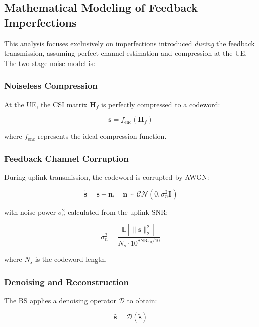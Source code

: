 \documentclass[lettersize,journal]{IEEEtran}
\begin{document}
\subsection{Mathematical Modeling of Feedback Imperfections}
\label{subsec:feedback_noise}

This analysis focuses exclusively on imperfections introduced \textit{during} the feedback transmission, assuming perfect channel estimation and compression at the UE. The two-stage noise model is:

\subsubsection{Noiseless Compression}
At the UE, the CSI matrix $\mathbf{H}_f$ is perfectly compressed to a codeword:

\begin{equation}
    \mathbf{s} = f_{\text{enc}}(\mathbf{H}_f)
\end{equation}

where $f_{\text{enc}}$ represents the ideal compression function.

\subsubsection{Feedback Channel Corruption}
During uplink transmission, the codeword is corrupted by AWGN:

\begin{equation}
    \tilde{\mathbf{s}} = \mathbf{s} + \mathbf{n}, \quad \mathbf{n} \sim \mathcal{CN}(0,\sigma_n^2\mathbf{I})
    \label{eq:noisy_feedback}
\end{equation}

with noise power $\sigma_n^2$ calculated from the uplink SNR:

\begin{equation}
    \sigma_n^2 = \frac{\mathbb{E}[\|\mathbf{s}\|_2^2]}{N_s \cdot 10^{\text{SNR}_{\text{dB}}/10}}
\end{equation}

where $N_s$ is the codeword length.

\subsubsection{Denoising and Reconstruction}
The BS applies a denoising operator $\mathcal{D}$ to obtain:

\begin{equation}
    \hat{\mathbf{s}} = \mathcal{D}(\tilde{\mathbf{s}})
\end{equation}
\end{document}
